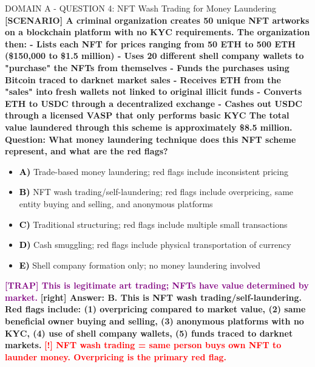 \documentclass[11pt,a4paper]{beamer}
\newcommand{\redflag}[1]{\textcolor{red}{\textbf{[!] #1}}}
\newcommand{\trap}[1]{\textcolor{purple}{\textbf{[TRAP] #1}}}
\newcommand{\correct}[1]{\textcolor{green!50!black}{\textbf{[right] #1}}}
\newcommand{\scenario}[1]{\textcolor{blue!70!black}{\textbf{[SCENARIO] #1}}}
\newcommand{\option}[1]{\textcolor{black}{\textbf{#1}}}
\begin{document}
\begin{frame}{DOMAIN A - QUESTION 4: NFT Wash Trading for Money Laundering}
\scenario{A criminal organization creates 50 unique NFT artworks on a blockchain platform with no KYC requirements. The organization then:
- Lists each NFT for prices ranging from 50 ETH to 500 ETH (\$150,000 to \$1.5 million)
- Uses 20 different shell company wallets to "purchase" the NFTs from themselves
- Funds the purchases using Bitcoin traced to darknet market sales
- Receives ETH from the "sales" into fresh wallets not linked to original illicit funds
- Converts ETH to USDC through a decentralized exchange
- Cashes out USDC through a licensed VASP that only performs basic KYC
The total value laundered through this scheme is approximately \$8.5 million.}
\vspace{0.2cm}
\textbf{Question: What money laundering technique does this NFT scheme represent, and what are the red flags?}
\vspace{0.1cm}
\begin{itemize}
    \item \option{A)} Trade-based money laundering; red flags include inconsistent pricing
    \item \option{B)} NFT wash trading/self-laundering; red flags include overpricing, same entity buying and selling, and anonymous platforms
    \item \option{C)} Traditional structuring; red flags include multiple small transactions
    \item \option{D)} Cash smuggling; red flags include physical transportation of currency
    \item \option{E)} Shell company formation only; no money laundering involved
\end{itemize}
\vspace{0.2cm}
\trap{This is legitimate art trading; NFTs have value determined by market.}
\correct{Answer: B. This is NFT wash trading/self-laundering. Red flags include: (1) overpricing compared to market value, (2) same beneficial owner buying and selling, (3) anonymous platforms with no KYC, (4) use of shell company wallets, (5) funds traced to darknet markets.}
\redflag{NFT wash trading = same person buys own NFT to launder money. Overpricing is the primary red flag.}
\end{frame}
\end{document}

